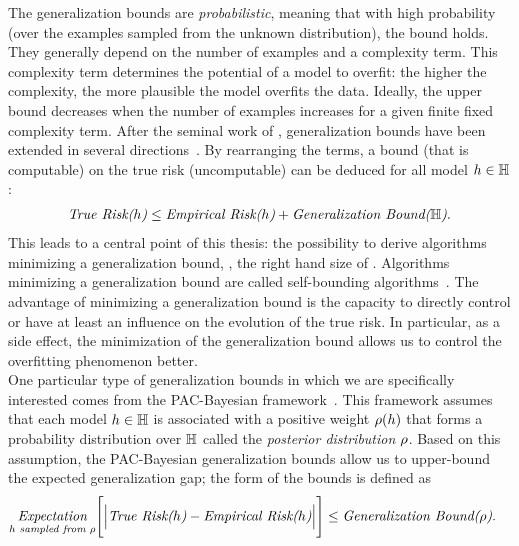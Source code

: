 The generalization bounds are {\it probabilistic}, meaning that with high probability (over the examples sampled from the unknown distribution), the bound holds.
They generally depend on the number of examples and a complexity term.
This complexity term determines the potential of a model to overfit: the higher the complexity, the more plausible the model overfits the data.
Ideally, the upper bound decreases when the number of examples increases for a given finite fixed complexity term.
After the seminal work of \citet{VapnikChervonenkis1968,VapnikChervonenkis1971,VapnikChervonenkis1974}, generalization bounds have been extended in several directions~\citep[see \eg, ][]{McAllester1998,BartlettMendelson2002,BousquetElisseeff2002}.
By rearranging the terms, a bound (that is computable) on the true risk (uncomputable) can be deduced for all model $h\in\mathbb{H}$:
\begin{align}
    \text{{\it True Risk($h$)}} \le \text{{\it Empirical Risk($h$)}}+\text{{\it Generalization Bound($\mathbb{H}$)}}.\label{intro:eq:bound}
\end{align}
This leads to a central point of this thesis: the possibility to derive algorithms minimizing a generalization bound, \eg, the right hand size of .
Algorithms minimizing a generalization bound are called self-bounding algorithms~\citep{Freund1998}.
The advantage of minimizing a generalization bound is the capacity to directly control or have at least an influence on the evolution of the true risk.
In particular, as a side effect, the minimization of the generalization bound allows us to control the overfitting phenomenon better.\\

One particular type of generalization bounds in which we are specifically interested comes from the PAC-Bayesian framework~\citep{ShaweTaylorWilliamson1997,McAllester1998}.
This framework assumes that each model $h\in\mathbb{H}$ is associated with a positive weight $\rho(h)$ that forms a probability distribution over $\mathbb{H}$ called the {\it posterior distribution} $\rho$.
Based on this assumption, the PAC-Bayesian generalization bounds allow us to upper-bound the expected generalization gap; the form of the bounds is defined as
\begin{align*}
    &\underset{\text{{\it $h$ sampled from $\rho$}}}{\text{{\it Expectation}}}\Bigg[ \Big| \text{{\it True Risk($h$)}} - \text{{\it Empirical Risk($h$)}}\Big| \Bigg] \le \text{{\it Generalization Bound($\rho$)}}.
\end{align*}

